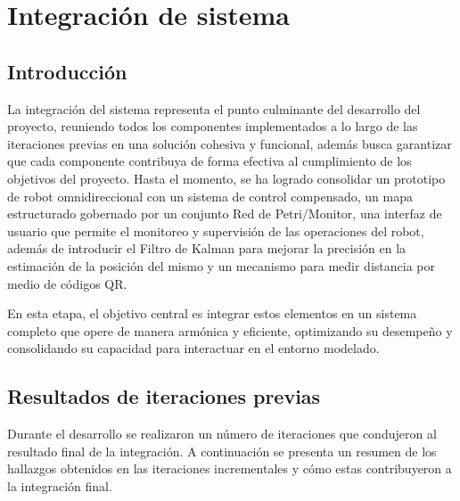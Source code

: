 \newpage
\chapter{Integración de sistema}

\section{Introducción}

La integración del sistema representa el punto culminante del desarrollo del proyecto, reuniendo todos los componentes implementados a lo largo de las iteraciones previas en una solución cohesiva y funcional, además busca garantizar que cada componente contribuya de forma efectiva al cumplimiento de los objetivos del proyecto. Hasta el momento, se ha logrado consolidar un prototipo de robot omnidireccional con un sistema de control compensado, un mapa estructurado gobernado por un conjunto Red de Petri/Monitor, una interfaz de usuario que permite el monitoreo y supervisión de las operaciones del robot, además de introducir el Filtro de Kalman para mejorar la precisión en la estimación de la posición del mismo y un mecanismo para medir distancia por medio de códigos QR.

En esta etapa, el objetivo central es integrar estos elementos en un sistema completo que opere de manera armónica y eficiente, optimizando su desempeño y consolidando su capacidad para interactuar en el entorno modelado.

\section{Resultados de iteraciones previas}

Durante el desarrollo se realizaron un número de iteraciones que condujeron al resultado final de la integración. A continuación se presenta un resumen de los hallazgos obtenidos en las iteraciones incrementales y cómo estas contribuyeron a la integración final.

